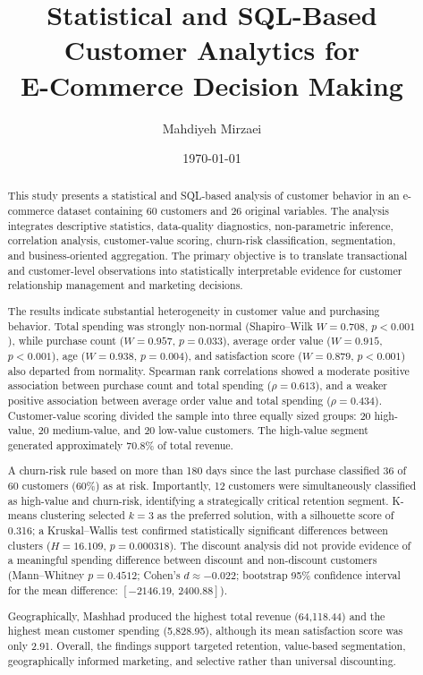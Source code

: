 \documentclass[11pt,a4paper]{article}
\title{\textbf{Statistical and SQL-Based Customer Analytics for\\
E-Commerce Decision Making}}
\author{Mahdiyeh Mirzaei}
\date{\today}
\begin{document}
\maketitle

\begin{abstract}
This study presents a statistical and SQL-based analysis of customer
behavior in an e-commerce dataset containing 60 customers and 26 original
variables. The analysis integrates descriptive statistics, data-quality
diagnostics, non-parametric inference, correlation analysis, customer-value
scoring, churn-risk classification, segmentation, and business-oriented
aggregation. The primary objective is to translate transactional and
customer-level observations into statistically interpretable evidence for
customer relationship management and marketing decisions.

The results indicate substantial heterogeneity in customer value and
purchasing behavior. Total spending was strongly non-normal
(Shapiro--Wilk $W=0.708$, $p<0.001$), while purchase count
($W=0.957$, $p=0.033$), average order value
($W=0.915$, $p<0.001$), age ($W=0.938$, $p=0.004$), and satisfaction
score ($W=0.879$, $p<0.001$) also departed from normality. Spearman
rank correlations showed a moderate positive association between purchase
count and total spending ($\rho=0.613$), and a weaker positive association
between average order value and total spending ($\rho=0.434$).
Customer-value scoring divided the sample into three equally sized groups:
20 high-value, 20 medium-value, and 20 low-value customers. The high-value
segment generated approximately 70.8\% of total revenue.

A churn-risk rule based on more than 180 days since the last purchase
classified 36 of 60 customers (60\%) as at risk. Importantly, 12 customers
were simultaneously classified as high-value and churn-risk, identifying
a strategically critical retention segment. K-means clustering selected
$k=3$ as the preferred solution, with a silhouette score of 0.316; a
Kruskal--Wallis test confirmed statistically significant differences
between clusters ($H=16.109$, $p=0.000318$). The discount analysis did not
provide evidence of a meaningful spending difference between discount and
non-discount customers (Mann--Whitney $p=0.4512$; Cohen's $d\approx-0.022$;
bootstrap 95\% confidence interval for the mean difference:
$[-2146.19,\,2400.88]$).

Geographically, Mashhad produced the highest total revenue
(64,118.44) and the highest mean customer spending (5,828.95), although
its mean satisfaction score was only 2.91. Overall, the findings support
targeted retention, value-based segmentation, geographically informed
marketing, and selective rather than universal discounting.
\end{abstract}
\end{document}
